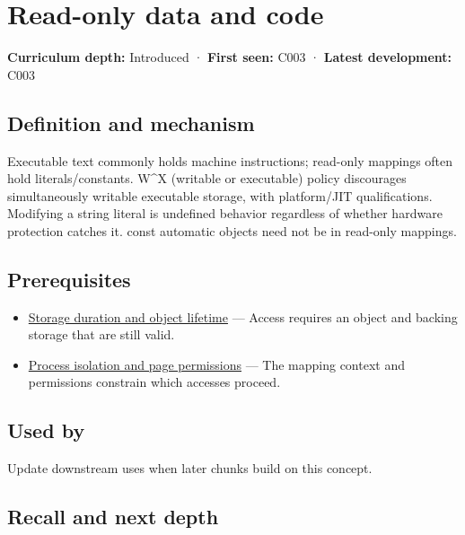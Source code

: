 \hypertarget{appendix-5f9e5e2f0a5e}{}\label{referencestart:appendix-5f9e5e2f0a5e}
\section{Read-only data and code}\label{appendix-5f9e5e2f0a5e-read-only-data-and-code}

\textbf{Curriculum depth:} Introduced · \textbf{First seen:} C003 · \textbf{Latest development:} C003

\subsection{Definition and mechanism}\label{appendix-5f9e5e2f0a5e-definition-and-mechanism}

Executable text commonly holds machine instructions; read-only mappings often hold literals/constants. W\^{}X (writable or executable) policy discourages simultaneously writable executable storage, with platform/JIT qualifications. Modifying a string literal is undefined behavior regardless of whether hardware protection catches it. const automatic objects need not be in read-only mappings.

\subsection{Prerequisites}\label{appendix-5f9e5e2f0a5e-prerequisites}

\begin{itemize}
\tightlist
\item
  \hyperref[appendix-0b104bcba06b]{Storage duration and object lifetime} --- Access requires an object and backing storage that are still valid.
\item
  \hyperref[appendix-c2a9ad1e2b49]{Process isolation and page permissions} --- The mapping context and permissions constrain which accesses proceed.
\end{itemize}

\subsection{Used by}\label{appendix-5f9e5e2f0a5e-used-by}

Update downstream uses when later chunks build on this concept.

\subsection{Recall and next depth}\label{appendix-5f9e5e2f0a5e-recall-and-next-depth}

